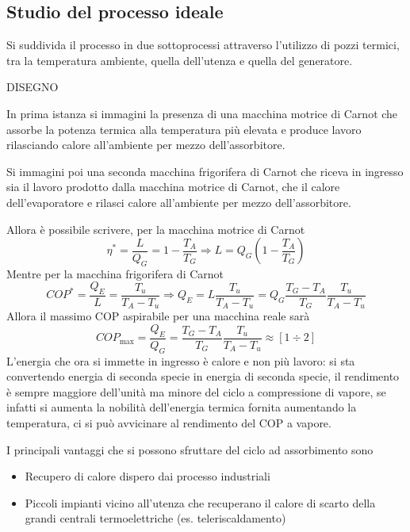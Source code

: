 \newpage


\subsection{Studio del processo ideale}
\begin{adjustwidth}{2in}{}
	Si suddivida il processo in due sottoprocessi attraverso l'utilizzo di pozzi termici, tra la temperatura ambiente, quella dell'utenza e quella del generatore.
	
	DISEGNO
	
	In prima istanza si immagini la presenza di una macchina motrice di Carnot che assorbe la potenza termica alla temperatura più elevata e produce lavoro rilasciando calore all'ambiente per mezzo dell'assorbitore.
	 
	Si immagini poi una seconda macchina frigorifera di Carnot che riceva in ingresso sia il lavoro prodotto dalla macchina motrice di Carnot, che il calore dell'evaporatore e rilasci calore all'ambiente per mezzo dell'assorbitore.
	
	Allora è possibile scrivere, per la macchina motrice di Carnot
	\[\eta^* = \dfrac{L}{Q_G} = 1 - \dfrac{T_A}{T_G} \Rightarrow L = Q_G\left(1-\dfrac{T_A}{T_G}\right)\]
	Mentre per la macchina frigorifera di Carnot
	\[COP^* = \dfrac{Q_E}{L} = \dfrac{T_u}{T_A-T_u} \Rightarrow Q_E = L\dfrac{T_u}{T_A-T_u} = Q_G\dfrac{T_G-T_A}{T_G}\dfrac{T_u}{T_A-T_u} \]
	Allora il massimo COP aspirabile per una macchina reale sarà 
	\[COP_{\max} = \dfrac{Q_E}{Q_G} = \dfrac{T_G-T_A}{T_G}\dfrac{T_u}{T_A-T_u}\approx [1\div2]\]
	L'energia che ora si immette in ingresso è calore e non più lavoro: si sta convertendo energia di seconda specie in energia di seconda specie, il rendimento è sempre maggiore dell'unità ma minore del ciclo a compressione di vapore, se infatti si aumenta la nobilità dell'energia termica fornita aumentando la temperatura, ci si può avvicinare al rendimento del COP a vapore. \newline 
	
	I principali vantaggi che si possono sfruttare del ciclo ad assorbimento sono 
	\begin{itemize}
		\item Recupero di calore dispero dai processo industriali
		\item Piccoli impianti vicino all'utenza che recuperano il calore di scarto della grandi centrali termoelettriche (es. teleriscaldamento)
	\end{itemize}
\end{adjustwidth}

